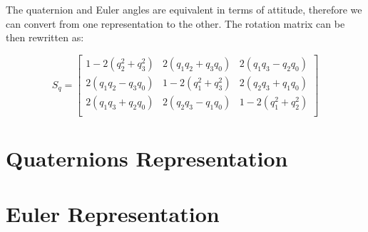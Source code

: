 The quaternion and Euler angles are equivalent in terms of attitude, therefore we can convert from one representation to the other. The rotation matrix can be then rewritten as:

  \begin{equation}
\label{S5}
 S_{q}=\begin{bmatrix}
 	1-2(q_{2}^{2}+q_{3}^{2}) & 2(q_{1}q_{2}+q_{3}q_{0}) & 2(q_{1}q_{3}-q_{2}q_{0}) \\
 	2(q_{1}q_{2}-q_{3}q_{0}) & 1-2(q_{1}^{2}+q_{3}^{2}) & 2(q_{2}q_{3}+q_{1}q_{0})  \\
 	2(q_{1}q_{3}+q_{2}q_{0}) & 2(q_{2}q_{3}-q_{1}q_{0}) & 1-2(q_{1}^{2}+q_{2}^{2}) \\
 	\end{bmatrix}
 	 \end{equation}

\section{Quaternions Representation}

\section{Euler Representation}
 	 
 	 